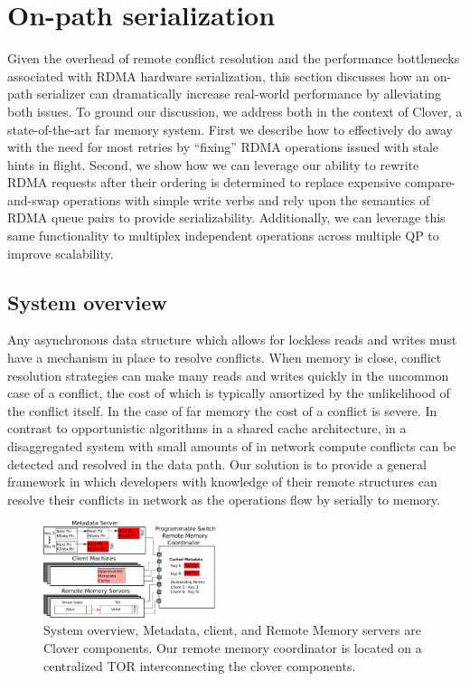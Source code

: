 \section{On-path serialization}

Given the overhead of remote conflict resolution and the performance
bottlenecks associated with RDMA hardware serialization, this section
discusses how an on-path serializer can dramatically increase
real-world performance by alleviating both issues.  To ground our
discussion, we address both in the context of Clover, a
state-of-the-art far memory system.  First we describe how to
effectively do away with the need for most retries by ``fixing'' RDMA
operations issued with stale hints in flight.  Second, we show how we
can leverage our ability to rewrite RDMA requests after their ordering
is determined to replace expensive compare-and-swap operations with
simple write verbs and rely upon the semantics of RDMA queue pairs to
provide serializability. Additionally, we can leverage this same
functionality to multiplex independent operations across multiple QP
to improve scalability.


\subsection{System overview}

Any asynchronous data structure which allows for lockless reads and
writes must have a mechanism in place to resolve conflicts. When
memory is close, conflict resolution strategies can make many reads
and writes quickly in the uncommon case of a conflict, the cost of
which is typically amortized by the unlikelihood of the conflict
itself. In the case of far memory the cost of a conflict is severe. In
contrast to opportunistic algorithms in a shared cache architecture,
in a disaggregated system with small amounts of in network compute
conflicts can be detected and resolved in the data path. Our solution
is to provide a general framework in which developers with knowledge
of their remote structures can resolve their conflicts in network as
the operations flow by serially to memory.

\begin{figure}
    \includegraphics[width=0.45\textwidth]{fig/overview.pdf}
    \caption{ System overview, Metadata, client, and Remote Memory
    servers are Clover components. Our remote memory coordinator is
    located on a centralized TOR interconnecting the clover components.
    }
    \label{fig:overview} 
\end{figure}

